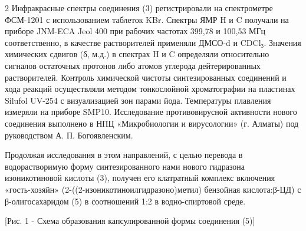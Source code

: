 
\begin{multicols}{2}
Инфракрасные спектры соединения (3) регистрировали на спектрометре
ФСМ-1201 с использованием таблеток KBr. Спектры ЯМР H
и C получали на приборе JNM-ECA Jeol 400 при рабочих
частотах 399,78 и 100,53 МГц соответственно, в качестве растворителей
применяли ДМСО-d и CDCl₃. Значения химических сдвигов
(δ, м.д.) в спектрах H и C
определяли относительно сигналов остаточных протонов либо атомов
углерода дейтерированных растворителей. Контроль химической чистоты
синтезированных соединений и хода реакций осуществляли методом
тонкослойной хроматографии на пластинах Silufol UV-254 с визуализацией
зон парами йода. Температуры плавления измеряли на приборе SMP10.
Исследование противовирусной активности нового соединения выполнено в
НПЦ «Микробиологии и вирусологии» (г. Алматы) под руководством А. П.
Богоявленским.

Продолжая исследования в этом направлений, с целью перевода в
водорастворимую форму синтезированного нами нового гидразона
изоникотиновой кислоты (3), получен его клатратный комплекс включения
«гость-хозяйн» (2-((2-изоникотиноилгидразоно)метил) бензойная
кислота:β-ЦД) с β-олигосахаридом (5) в соотношений 1:2 в водно-спиртовой
среде.
\end{multicols}

[Рис. 1 - Схема образования капсулированной формы соединения (5)]

